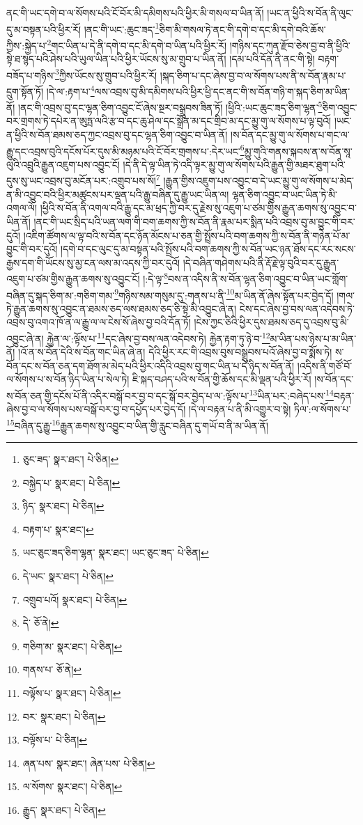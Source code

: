 ནང་གི་ཡང་དགེ་བ་ལ་སོགས་པའི་ངོ་བོར་མི་དམིགས་པའི་ཕྱིར་མི་གསལ་བ་ཡིན་ནོ། །ཡང་ན་ཕྱིའི་ས་བོན་ནི་ལུང་དུ་མ་བསྟན་པའི་ཕྱིར་རོ། །ནང་གི་ཡང་:ཆུང་ཟད་\footnote{ཅུང་ཟད་  སྣར་ཐང་།  པེ་ཅིན། }ཅིག་མི་གསལ་ཏེ་ནང་གི་དགེ་བ་དང་མི་དགེ་བའི་ཆོས་ཀྱིས་:སྐྱེད་པ་\footnote{བསྐྱེད་པ་  སྣར་ཐང་།  པེ་ཅིན། }གང་ཡིན་པ་དེ་ནི་དགེ་བ་དང་མི་དགེ་བ་ཡིན་པའི་ཕྱིར་རོ། །གཉིས་དང་ཀུན་རྫོབ་ཅེས་བྱ་བ་ནི་ཕྱིའི་སྟེ་ཐ་སྙད་པའི་ཤེས་པའི་ཡུལ་ཡིན་པའི་ཕྱིར་ཡོངས་སུ་མ་གྲུབ་པ་ཡིན་ནོ། །དམ་པའི་དོན་ནི་ནང་གི་སྟེ། བརྟག་བཟོད་པ་གཉིས་\footnote{ཉིད་  སྣར་ཐང་།  པེ་ཅིན། }ཀྱིས་ཡོངས་སུ་གྲུབ་པའི་ཕྱིར་རོ། །སྐད་ཅིག་པ་དང་ཞེས་བྱ་བ་ལ་སོགས་པས་ནི་ས་བོན་རྣམ་པ་དྲུག་སྟོན་ཏོ། །དེ་ལ་:རྟག་པ་\footnote{བརྟག་པ་  སྣར་ཐང་། }ལས་འབྲས་བུ་མི་དམིགས་པའི་ཕྱིར་ཕྱི་དང་ནང་གི་ས་བོན་གཉི་ག་སྐད་ཅིག་མ་ཡིན་ནོ། །ནང་གི་འབྲས་བུ་དང་ལྷན་ཅིག་འབྱུང་ངོ་ཞེས་སྔར་བསྒྲུབས་ཟིན་ཏོ། །ཕྱིའི་:ཡང་ཆུང་ཟད་ཅིག་ལྷན་\footnote{ཡང་ཅུང་ཟད་ཅིག་ལྷན་  སྣར་ཐང་། ཡང་ཅུང་ཟད་  པེ་ཅིན། }ཅིག་འབྱུང་བར་གྲགས་ཏེ་དཔེར་ན་ཨུཏྤ་ལའི་རྩ་བ་དང་ཆུ་ཤེལ་དང་སྒྲོན་མ་དང་གྲིབ་མ་དང་མྱུ་གུ་ལ་སོགས་པ་ལྟ་བུའོ། །ཡང་ན་ཕྱིའི་ས་བོན་ཐམས་ཅད་ཀྱང་འབྲས་བུ་དང་ལྷན་ཅིག་འབྱུང་བ་ཡིན་ནོ། །ས་བོན་དང་མྱུ་གུ་ལ་སོགས་པ་གང་ལ་རྒྱུ་དང་འབྲས་བུའི་དངོས་པོར་དུས་མི་མཉམ་པའི་ངོ་བོར་གྲགས་པ་:དེར་ཡང་\footnote{དེ་ཡང་  སྣར་ཐང་།  པེ་ཅིན། }མྱུ་གུའི་གནས་སྐབས་ན་ས་བོན་སཱ་ལུའི་འབྲུའི་རྒྱུན་འཇུག་པས་འབྱུང་ངོ། །དེ་ནི་དེ་ལྟ་ཡིན་ཏེ་འདི་ལྟར་མྱུ་གུ་ལ་སོགས་པའི་རྒྱུན་གྱི་མཐར་ཐུག་པའི་དུས་སུ་ཡང་འབྲས་བུ་མངོན་པར་:འགྲུབ་པས་སོ།\footnote{འགྲུབ་པའོ།  སྣར་ཐང་།  པེ་ཅིན། } །རྒྱུན་གྱིས་འཇུག་པས་འབྱུང་བ་དེ་ཡང་མྱུ་གུ་ལ་སོགས་པ་མེད་ན་མི་འབྱུང་བའི་ཕྱིར་མཚུངས་པར་ལྡན་པའི་རྒྱུ་བཞིན་དུ་རྒྱུ་ཡང་ཡིན་ལ། ལྷན་ཅིག་འབྱུང་བ་ཡང་ཡིན་ཏེ་མི་འགལ་ལོ། །ཕྱིའི་ས་བོན་ནི་འགལ་བའི་རྒྱུ་དང་མ་ཕྲད་ཀྱི་བར་དུ་རྗེས་སུ་འཇུག་པ་ཙམ་གྱིས་རྒྱུན་ཆགས་སུ་འབྱུང་བ་ཡིན་ནོ། །ནང་གི་ཡང་སྲིད་པའི་ཡན་ལག་གི་བག་ཆགས་ཀྱི་ས་བོན་ནི་རྣམ་པར་སྨིན་པའི་འབྲས་བུ་མ་བྱུང་གི་བར་དུའོ། །འཇིག་ཚོགས་ལ་ལྟ་བའི་ས་བོན་དང་ཉོན་མོངས་པ་ཅན་གྱི་སྤྲོས་པའི་བག་ཆགས་ཀྱི་ས་བོན་ནི་གཉེན་པོ་མ་བྱུང་གི་བར་དུའོ། །དགེ་བ་དང་ལུང་དུ་མ་བསྟན་པའི་སྤྲོས་པའི་བག་ཆགས་ཀྱི་ས་བོན་ཡང་ཉན་ཐོས་དང་རང་སངས་རྒྱས་དག་གི་ཡོངས་སུ་མྱ་ངན་ལས་མ་འདས་ཀྱི་བར་དུའོ། །དེ་བཞིན་གཤེགས་པའི་ནི་རྡོ་རྗེ་ལྟ་བུའི་བར་དུ་རྒྱུན་འཇུག་པ་ཙམ་གྱིས་རྒྱུན་ཆགས་སུ་འབྱུང་ངོ། །:དེ་ལྟ་\footnote{དེ་  ཅོ་ནེ། }བས་ན་འདིས་ནི་ས་བོན་ལྷན་ཅིག་འབྱུང་བ་ཡིན་ཡང་གློག་བཞིན་དུ་སྐད་ཅིག་མ་:གཅིག་གམ་\footnote{གཅིག་མ་  སྣར་ཐང་།  པེ་ཅིན། }གཉིས་སམ་གསུམ་དུ་:གནས་པ་ནི་\footnote{གནས་པ་  ཅོ་ནེ། }མ་ཡིན་ནོ་ཞེས་སྟོན་པར་བྱེད་དོ། །གལ་ཏེ་རྒྱུན་ཆགས་སུ་འབྱུང་ན་ཐམས་ཅད་ལས་ཐམས་ཅད་ཅི་སྟེ་མི་འབྱུང་ཞེ་ན། ངེས་དང་ཞེས་བྱ་བས་ལན་འདེབས་ཏེ་འབྲས་བུ་འགའ་ཁོ་ན་ལ་རྒྱུ་ལ་ལ་ངེས་སོ་ཞེས་བྱ་བའི་དོན་ཏོ། །ངེས་ཀྱང་ཅིའི་ཕྱིར་དུས་ཐམས་ཅད་དུ་འབྲས་བུ་མི་འབྱུང་ཞེ་ན། རྐྱེན་ལ་:ལྟོས་པ་\footnote{བལྟོས་པ་  སྣར་ཐང་།  པེ་ཅིན། }དང་ཞེས་བྱ་བས་ལན་འདེབས་ཏེ། རྐྱེན་རྟག་ཏུ་ཉེ་བ་\footnote{བར་  སྣར་ཐང་།  པེ་ཅིན། }མ་ཡིན་པས་ཉེས་པ་མ་ཡིན་ནོ། །འོ་ན་ས་བོན་དེའི་ས་བོན་གང་ཡིན་ཞེ་ན། དེའི་ཕྱིར་རང་གི་འབྲས་བུས་བསྒྲུབས་པའོ་ཞེས་བྱ་བ་སྨོས་ཏེ། ས་བོན་དང་ས་བོན་ཅན་དག་ཐོག་མ་མེད་པའི་ཕྱིར་འདིའི་འབྲས་བུ་གང་ཡིན་པ་དེ་ཉིད་ས་བོན་ནོ། །འདིས་ནི་གཙོ་བོ་ལ་སོགས་པ་ས་བོན་ཉིད་ཡིན་པ་སེལ་ཏེ། ཇི་སྐད་བཤད་པའི་ས་བོན་གྱི་ཆོས་དང་མི་ལྡན་པའི་ཕྱིར་རོ། །ས་བོན་དང་ས་བོན་ཅན་གྱི་དངོས་པོ་ནི་འདིར་བསྒོ་བར་བྱ་བ་དང་སྒོ་བར་བྱེད་པ་ལ་:ལྟོས་པ་\footnote{བལྟོས་པ་  པེ་ཅིན། }ཡིན་པར་:བཞེད་པས་\footnote{ཞན་པས་  སྣར་ཐང་། ཞེན་པས་  པེ་ཅིན། }བརྟན་ཞེས་བྱ་བ་ལ་སོགས་པས་བསྒོ་བར་བྱ་བ་དཔྱོད་པར་བྱེད་དོ། །དེ་ལ་བརྟན་པ་ནི་མི་འགྱུར་བ་སྟེ། ཏིལ་:ལ་སོགས་པ་\footnote{ལ་སོགས་  སྣར་ཐང་།  པེ་ཅིན། }བཞིན་དུ་རྒྱུ་\footnote{རྒྱུད་  སྣར་ཐང་།  པེ་ཅིན། }རྒྱུན་ཆགས་སུ་འབྱུང་བ་ཡིན་གྱི་རླུང་བཞིན་དུ་གཡོ་བ་ནི་མ་ཡིན་ནོ། 